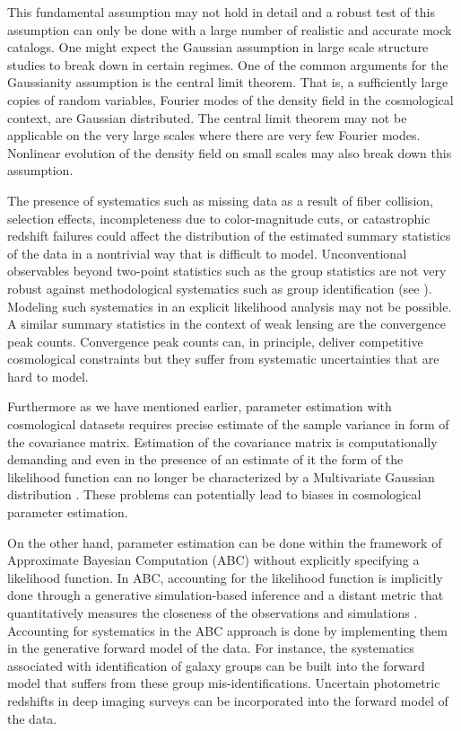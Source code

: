 This fundamental assumption may not hold in detail and a robust test of this assumption can only be done with a large 
number of realistic and accurate mock catalogs. One might expect the Gaussian assumption in large scale structure studies 
to break down in certain regimes. One of the common arguments for the Gaussianity assumption is the central limit theorem. That is, a sufficiently large copies 
of random variables, Fourier modes of the density field in the cosmological context, are Gaussian distributed. The central limit theorem may not be applicable on 
the very large scales where there are very few Fourier modes. Nonlinear evolution of the density field on small scales may also break down this assumption. 

The presence of systematics such as missing data as a result of fiber collision, selection effects, incompleteness due to color-magnitude cuts, 
or catastrophic redshift failures \citep{Guo:2012a,Ross:2012aa,Hahn:2017a} could affect the distribution of the estimated summary statistics of the data 
in a nontrivial way that is difficult to model. Unconventional observables beyond two-point statistics such as the group statistics are not very 
robust against methodological systematics such as group identification (see \citealt{berlind2006,campbell2015}). Modeling such systematics in an explicit likelihood analysis may not be possible. A similar summary statistics in the context of weak lensing are the convergence peak counts. Convergence peak counts can, in principle, deliver competitive cosmological constraints but they suffer from systematic uncertainties \citep{abcwl2} that are hard to model. 

Furthermore as we have mentioned earlier, parameter estimation with cosmological datasets requires precise estimate of 
the sample variance in form of the covariance matrix. Estimation of the covariance matrix is computationally demanding \citep{nifty,harnois} and even 
in the presence of an estimate of it the form of the likelihood function can no longer be characterized by a Multivariate Gaussian distribution \citep{Sellentin:2016a,Sellentin:2017a}.
These problems can potentially lead to biases in cosmological parameter estimation.

On the other hand, parameter estimation can be done within the framework of Approximate Bayesian Computation (ABC) without explicitly 
specifying a likelihood function. In ABC, accounting for the likelihood function is implicitly done through a 
generative simulation-based inference and a distant metric that quantitatively 
measures the closeness of the observations and simulations \citep{optimalkernel,abcpmc}. Accounting for systematics in the ABC approach is done by implementing 
them in the generative forward model of the data. For instance, the systematics associated with identification of galaxy groups can be built into the forward model that suffers from these group mis-identifications. Uncertain photometric redshifts in deep imaging surveys can be incorporated into the forward model of the data.   


